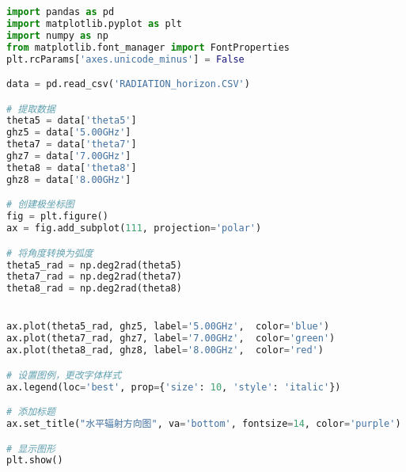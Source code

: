 \documentclass[12pt,hyperref,a4paper,UTF8]{ctexart}
\begin{document}
\begin{lstlisting}[language=Python, caption=代码5]
import pandas as pd
import matplotlib.pyplot as plt
import numpy as np
from matplotlib.font_manager import FontProperties
plt.rcParams['axes.unicode_minus'] = False

data = pd.read_csv('RADIATION_horizon.CSV')

# 提取数据
theta5 = data['theta5']
ghz5 = data['5.00GHz']
theta7 = data['theta7']
ghz7 = data['7.00GHz']
theta8 = data['theta8']
ghz8 = data['8.00GHz']

# 创建极坐标图
fig = plt.figure()
ax = fig.add_subplot(111, projection='polar')

# 将角度转换为弧度
theta5_rad = np.deg2rad(theta5)
theta7_rad = np.deg2rad(theta7)
theta8_rad = np.deg2rad(theta8)


ax.plot(theta5_rad, ghz5, label='5.00GHz',  color='blue')
ax.plot(theta7_rad, ghz7, label='7.00GHz',  color='green')
ax.plot(theta8_rad, ghz8, label='8.00GHz',  color='red')

# 设置图例，更改字体样式
ax.legend(loc='best', prop={'size': 10, 'style': 'italic'})

# 添加标题
ax.set_title("水平辐射方向图", va='bottom', fontsize=14, color='purple')

# 显示图形
plt.show()

\end{lstlisting}


\end{document}
